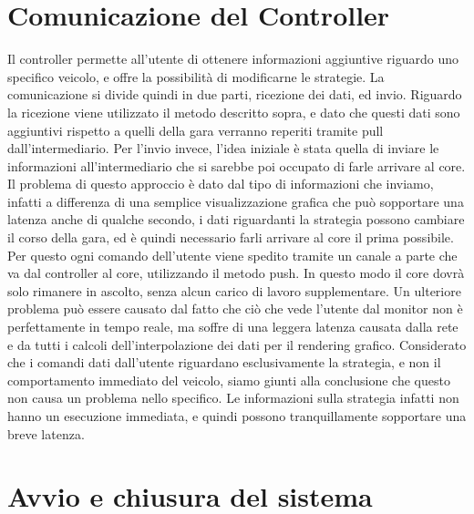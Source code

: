 
\section{Comunicazione del Controller}

Il controller permette all’utente di ottenere informazioni aggiuntive riguardo uno specifico veicolo, e offre la possibilità di modificarne le strategie.
La comunicazione si divide quindi in due parti, ricezione dei dati, ed invio.
Riguardo la ricezione viene utilizzato il metodo descritto sopra, e dato che questi dati sono aggiuntivi rispetto a quelli della gara verranno reperiti tramite pull dall’intermediario.
Per l’invio invece, l’idea iniziale è stata quella di inviare le informazioni all’intermediario che si sarebbe poi  occupato di farle arrivare al core. Il problema di questo approccio è dato dal tipo di informazioni che inviamo, infatti a differenza di una semplice visualizzazione grafica che può sopportare una latenza anche di qualche secondo, i dati riguardanti la strategia possono cambiare il corso della gara, ed è quindi necessario farli arrivare al core il prima possibile. Per questo ogni comando dell’utente viene spedito tramite un canale a parte che va dal controller al core, utilizzando il metodo push. In questo modo il core dovrà solo rimanere in ascolto, senza alcun carico di lavoro supplementare. 
Un ulteriore problema può essere causato dal fatto che ciò che vede l’utente dal monitor non è perfettamente in tempo reale, ma soffre di una leggera latenza causata dalla rete e da tutti i calcoli dell’interpolazione dei dati per il rendering grafico. Considerato che i comandi dati dall’utente riguardano esclusivamente la strategia, e non il comportamento immediato del veicolo, siamo giunti alla conclusione che questo non causa un problema nello specifico. Le informazioni sulla strategia infatti non hanno un esecuzione immediata, e quindi possono tranquillamente sopportare una breve latenza.


\section{Avvio e chiusura del sistema}

